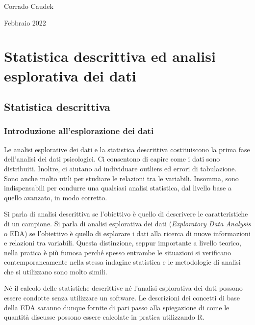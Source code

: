 \documentclass[
  10pt,
  italian,
  a4paper,
  extrafontsizes,onecolumn,openright
  ]{memoir}
\theoremstyle{definition}
\theoremstyle{definition}
\theoremstyle{definition}
\theoremstyle{definition}
\theoremstyle{remark}
\begin{document}
\bigskip

Corrado Caudek

\bigskip

Febbraio 2022

\mainmatter

\hypertarget{part-statistica-descrittiva-ed-analisi-esplorativa-dei-dati}{%
\part*{Statistica descrittiva ed analisi esplorativa dei dati}\label{part-statistica-descrittiva-ed-analisi-esplorativa-dei-dati}}

\hypertarget{descriptive-stats}{%
\chapter{Statistica descrittiva}\label{descriptive-stats}}

\hypertarget{chapter-descript}{%
\section{Introduzione all'esplorazione dei dati}\label{chapter-descript}}

Le analisi esplorative dei dati e la statistica descrittiva costituiscono la prima fase dell'analisi dei dati psicologici. Ci consentono di capire come i dati sono distribuiti. Inoltre, ci aiutano ad individuare outliers ed errori di tabulazione. Sono anche molto utili per studiare le relazioni tra le variabili. Insomma, sono indispensabili per condurre una qualsiasi analisi statistica, dal livello base a quello avanzato, in modo corretto.

Si parla di analisi descrittiva se l'obiettivo è quello di descrivere le caratteristiche di un campione. Si parla di analisi esplorativa dei dati (\emph{Exploratory Data Analysis} o EDA) se l'obiettivo è quello di esplorare i dati alla ricerca di nuove informazioni e relazioni tra variabili. Questa distinzione, seppur importante a livello teorico, nella pratica è più fumosa perché spesso entrambe le situazioni si verificano contemporaneamente nella stessa indagine statistica e le metodologie di analisi che si utilizzano sono molto simili.

Né il calcolo delle statistiche descrittive né l'analisi esplorativa dei dati possono essere condotte senza utilizzare un software. Le descrizioni dei concetti di base della EDA saranno dunque fornite di pari passo alla spiegazione di come le quantità discusse possono essere calcolate in pratica utilizzando R.
\end{document}
